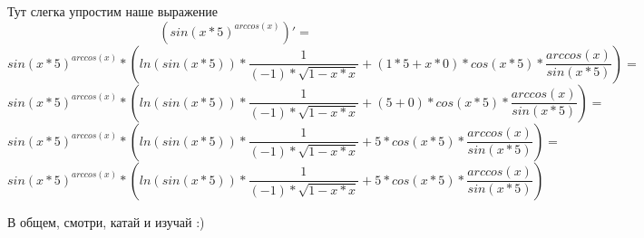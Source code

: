 \documentclass[a4paper,12pt]{article}
\begin{document}
Тут слегка упростим наше выражение
\begin{equation}
\left( {sin \left( {{x }* {5 }}\right) }^ {arccos \left( {x }\right) }\right)' =
\end{equation}
\begin{equation}
{{sin \left( {{x }* {5 }}\right) }^ {arccos \left( {x }\right) }}* {\left( {{ln \left( {sin \left( {{x }* {5 }}\right) }\right) }* {\frac{{1 }}{{{\left( -1 \right) }* {\sqrt {{{1 }- {{x }* {x }}}} }}}}}+ {{{\left( {{1 }* {5 }}+ {{x }* {0 }}\right) }* {cos \left( {{x }* {5 }}\right) }}* {\frac{{arccos \left( {x }\right) }}{{sin \left( {{x }* {5 }}\right) }}}}\right) }=
\end{equation}
\begin{equation}
{{sin \left( {{x }* {5 }}\right) }^ {arccos \left( {x }\right) }}* {\left( {{ln \left( {sin \left( {{x }* {5 }}\right) }\right) }* {\frac{{1 }}{{{\left( -1 \right) }* {\sqrt {{{1 }- {{x }* {x }}}} }}}}}+ {{{\left( {5 }+ {0 }\right) }* {cos \left( {{x }* {5 }}\right) }}* {\frac{{arccos \left( {x }\right) }}{{sin \left( {{x }* {5 }}\right) }}}}\right) }=
\end{equation}
\begin{equation}
{{sin \left( {{x }* {5 }}\right) }^ {arccos \left( {x }\right) }}* {\left( {{ln \left( {sin \left( {{x }* {5 }}\right) }\right) }* {\frac{{1 }}{{{\left( -1 \right) }* {\sqrt {{{1 }- {{x }* {x }}}} }}}}}+ {{{5 }* {cos \left( {{x }* {5 }}\right) }}* {\frac{{arccos \left( {x }\right) }}{{sin \left( {{x }* {5 }}\right) }}}}\right) }=
\end{equation}
\begin{equation}
{{sin \left( {{x }* {5 }}\right) }^ {arccos \left( {x }\right) }}* {\left( {{ln \left( {sin \left( {{x }* {5 }}\right) }\right) }* {\frac{{1 }}{{{\left( -1 \right) }* {\sqrt {{{1 }- {{x }* {x }}}} }}}}}+ {{{5 }* {cos \left( {{x }* {5 }}\right) }}* {\frac{{arccos \left( {x }\right) }}{{sin \left( {{x }* {5 }}\right) }}}}\right) }
\end{equation}

В общем, смотри, катай и изучай :)
\end{document}

